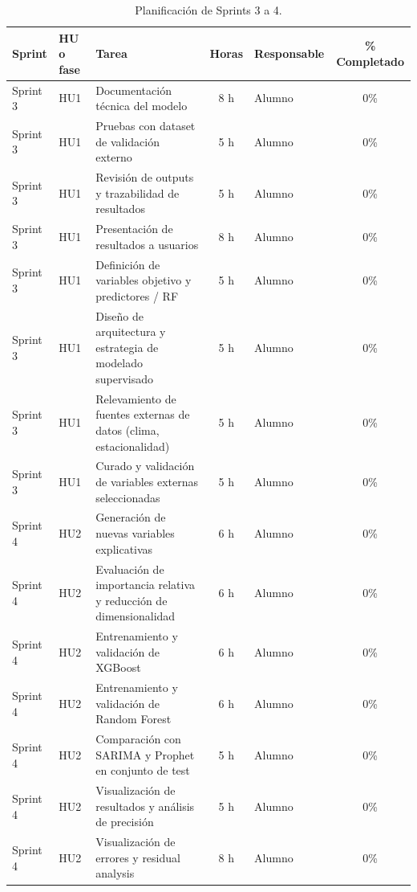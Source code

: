 \documentclass[
11pt, %
]{charter}
\begin{document}
\begin{table}[htpb]
\centering
\caption{Planificación de Sprints 3 a 4.}
\begin{tabularx}{\linewidth}{@{}|l|l|X|c|l|c|@{}}
\hline
\rowcolor[HTML]{C0C0C0}
Sprint & HU o fase & Tarea & Horas & Responsable & \% Completado \\ \hline
Sprint 3 & HU1 & Documentación técnica del modelo & 8 h & Alumno & 0\% \\ \hline
Sprint 3 & HU1 & Pruebas con dataset de validación externo & 5 h & Alumno & 0\% \\ \hline
Sprint 3 & HU1 & Revisión de outputs y trazabilidad de resultados & 5 h & Alumno & 0\% \\ \hline
Sprint 3 & HU1 & Presentación de resultados a usuarios & 8 h & Alumno & 0\% \\ \hline
Sprint 3 & HU1 & Definición de variables objetivo y predictores / RF & 5 h & Alumno & 0\% \\ \hline
Sprint 3 & HU1 & Diseño de arquitectura y estrategia de modelado supervisado & 5 h & Alumno & 0\% \\ \hline
Sprint 3 & HU1 & Relevamiento de fuentes externas de datos (clima, estacionalidad) & 5 h & Alumno & 0\% \\ \hline
Sprint 3 & HU1 & Curado y validación de variables externas seleccionadas & 5 h & Alumno & 0\% \\ \hline
\hline
Sprint 4 & HU2 & Generación de nuevas variables explicativas & 6 h & Alumno & 0\% \\ \hline
Sprint 4 & HU2 & Evaluación de importancia relativa y reducción de dimensionalidad & 6 h & Alumno & 0\% \\ \hline
Sprint 4 & HU2 & Entrenamiento y validación de XGBoost & 6 h & Alumno & 0\% \\ \hline
Sprint 4 & HU2 & Entrenamiento y validación de Random Forest & 6 h & Alumno & 0\% \\ \hline
Sprint 4 & HU2 & Comparación con SARIMA y Prophet en conjunto de test & 5 h & Alumno & 0\% \\ \hline
Sprint 4 & HU2 & Visualización de resultados y análisis de precisión & 5 h & Alumno & 0\% \\ \hline
Sprint 4 & HU2 & Visualización de errores y residual analysis & 8 h & Alumno & 0\% \\ \hline
\end{tabularx}
\end{table}
\end{document}
